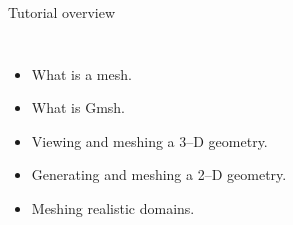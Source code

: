 \documentclass[t]{beamer}
\begin{document}
\begin{frame}{Tutorial overview~~~~~~~}
\begin{columns}[l]

\column{2.8in}
  \begin{itemize}
     \item What is a mesh.\\[17pt]
     \item What is Gmsh.\\[17pt]
     \item Viewing and meshing a 3--D geometry.\\[17pt]
     \item Generating and meshing a 2--D geometry.\\[17pt]
     \item Meshing realistic domains.
  \end{itemize}


\end{columns}
\end{frame}
\end{document}
